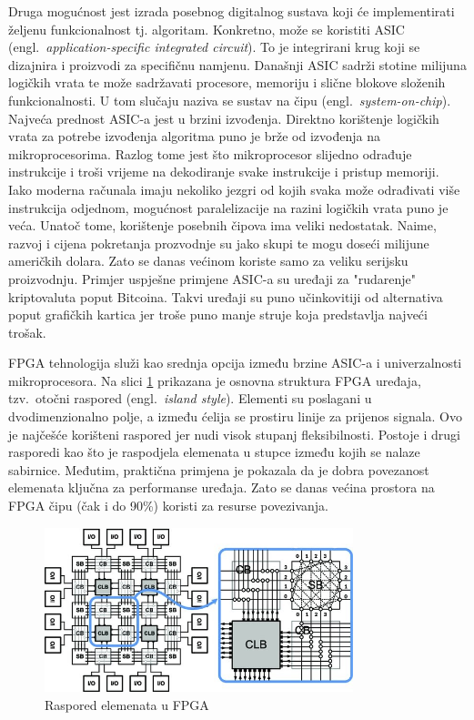 \documentclass[times, utf8, diplomski]{fer}
\begin{document}
Druga mogućnost jest izrada posebnog digitalnog sustava koji će implementirati željenu funkcionalnost tj. algoritam. Konkretno, može se koristiti ASIC (engl.~\textit{application-specific integrated circuit}). To je integrirani krug koji se dizajnira i proizvodi za specifičnu namjenu. Današnji ASIC sadrži stotine milijuna logičkih vrata te može sadržavati procesore, memoriju i slične blokove složenih funkcionalnosti. U tom slučaju naziva se sustav na čipu (engl.~\textit{system-on-chip}). Najveća prednost ASIC-a jest u brzini izvođenja. Direktno korištenje logičkih vrata za potrebe izvođenja algoritma puno je brže od izvođenja na mikroprocesorima. Razlog tome jest što mikroprocesor slijedno odrađuje instrukcije i troši vrijeme na dekodiranje svake instrukcije i pristup memoriji. Iako moderna računala imaju nekoliko jezgri od kojih svaka može odrađivati više instrukcija odjednom, mogućnost paralelizacije na razini logičkih vrata puno je veća. Unatoč tome, korištenje posebnih čipova ima veliki nedostatak. Naime, razvoj i cijena pokretanja prozvodnje su jako skupi te mogu doseći milijune američkih dolara. Zato se danas većinom koriste samo za veliku serijsku proizvodnju. Primjer uspješne primjene ASIC-a su uređaji za "rudarenje" kriptovaluta poput Bitcoina. Takvi uređaji su puno učinkovitiji od alternativa poput grafičkih kartica jer troše puno manje struje koja predstavlja najveći trošak.

FPGA tehnologija služi kao srednja opcija između brzine ASIC-a i univerzalnosti mikroprocesora. Na slici \ref{fig:fpga_island} prikazana je osnovna struktura FPGA uređaja, tzv.~otočni raspored (engl.~\textit{island style}). Elementi su poslagani u dvodimenzionalno polje, a između ćelija se prostiru linije za prijenos signala. Ovo je najčešće korišteni raspored jer nudi visok stupanj fleksibilnosti. Postoje i drugi rasporedi kao što je raspodjela elemenata u stupce između kojih se nalaze sabirnice. Međutim, praktična primjena je pokazala da je dobra povezanost elemenata ključna za performanse uređaja. Zato se danas većina prostora na FPGA čipu (čak i do 90\%) koristi za resurse povezivanja.

\begin{figure}[htb]
	\centering
	\includegraphics[width=0.8\textwidth]{img/fpga_island_notext.jpg}
	\caption{Raspored elemenata u FPGA}
	\label{fig:fpga_island}
\end{figure}
\end{document}
